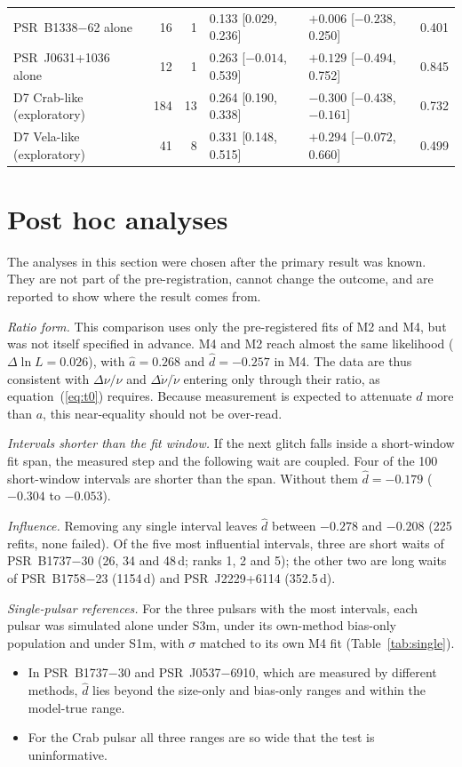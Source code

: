 \documentclass[fleqn,usenatbib]{mnras}
\newcommand{\dnu}{\Delta\nu/\nu}
\newcommand{\dnud}{\Delta\dot\nu/\dot\nu}
\newcommand{\dhat}{\hat d}
\newcommand{\psr}[1]{PSR~#1}
\begin{document}
\begin{table}
\begin{tabular}{@{}lrrlll@{}}
\psr{B1338$-$62} alone & 16 & 1 & 0.133 [0.029, 0.236] & $+0.006$ [$-0.238$, 0.250] & 0.401\\
\psr{J0631+1036} alone & 12 & 1 & 0.263 [$-0.014$, 0.539] & $+0.129$ [$-0.494$, 0.752] & 0.845\\
\midrule
D7 Crab-like (exploratory) & 184 & 13 & 0.264 [0.190, 0.338] & $-0.300$ [$-0.438$, $-0.161$] & 0.732\\
D7 Vela-like (exploratory) & 41 & 8 & 0.331 [0.148, 0.515] & $+0.294$ [$-0.072$, 0.660] & 0.499\\
\bottomrule
\end{tabular}
\end{table}

\section{Post hoc analyses}\label{sec:posthoc}
The analyses in this section were chosen after the primary result was
known. They are not part of the pre-registration, cannot change the
outcome, and are reported to show where the result comes from.

\emph{Ratio form.} This comparison uses only the pre-registered fits of
M2 and M4, but was not itself specified in advance. M4 and M2 reach almost
the same likelihood ($\Delta\ln
L=0.026$), with $\hat a=0.268$ and $\dhat=-0.257$ in M4. The data are thus
consistent with $\dnu$ and $\dnud$ entering only through their ratio, as
equation~(\ref{eq:t0}) requires. Because measurement is expected to
attenuate $d$ more than $a$, this near-equality should not be over-read.

\emph{Intervals shorter than the fit window.} If the next glitch falls
inside a short-window fit span, the measured step and the following wait
are coupled. Four of the 100 short-window intervals are shorter than the
span. Without them $\dhat=-0.179$ ($-0.304$ to $-0.053$).

\emph{Influence.} Removing any single interval leaves $\dhat$ between
$-0.278$ and $-0.208$ (225 refits, none failed). Of the five most
influential intervals, three are short waits of \psr{B1737$-$30} (26,
34 and 48\,d; ranks 1, 2 and 5); the other two are long waits of
\psr{B1758$-$23} (1154\,d) and \psr{J2229+6114} (352.5\,d).

\emph{Single-pulsar references.} For the three pulsars with the most
intervals, each pulsar was simulated alone under S3m, under its own-method
bias-only population and under S1m, with $\sigma$ matched to its own M4
fit (Table~\ref{tab:single}).
\begin{itemize}
\item In \psr{B1737$-$30} and \psr{J0537$-$6910}, which are measured by
different methods, $\dhat$ lies beyond the size-only and bias-only ranges
and within the model-true range.
\item For the Crab pulsar all three ranges are so wide that the test is
uninformative.
\end{itemize}
\end{document}
